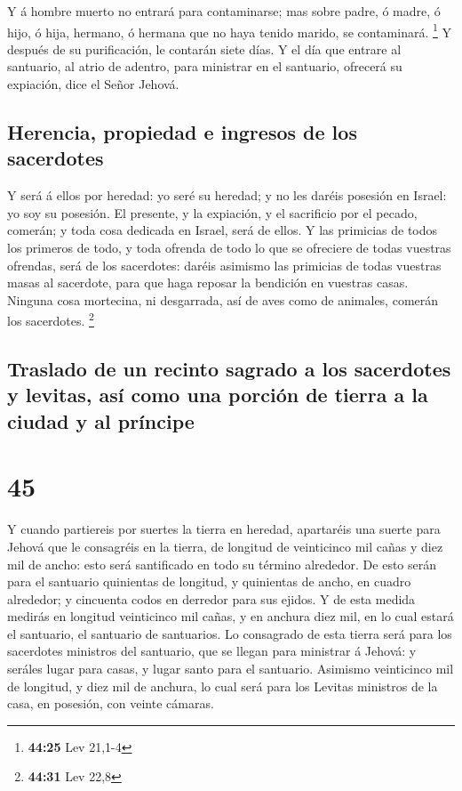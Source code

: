  Y á hombre muerto no entrará para contaminarse; mas sobre
padre, ó madre, ó hijo, ó hija, hermano, ó hermana que no haya tenido
marido, se contaminará. \footnote{\textbf{44:25} Lev 21,1-4}
 Y después de su purificación, le contarán siete días.
 Y el día que entrare al santuario, al atrio de adentro,
para ministrar en el santuario, ofrecerá su expiación, dice el Señor
Jehová.

\hypertarget{herencia-propiedad-e-ingresos-de-los-sacerdotes}{%
\subsection{Herencia, propiedad e ingresos de los
sacerdotes}\label{herencia-propiedad-e-ingresos-de-los-sacerdotes}}

 Y será á ellos por heredad: yo seré su heredad; y no les
daréis posesión en Israel: yo soy su posesión.  El
presente, y la expiación, y el sacrificio por el pecado, comerán; y toda
cosa dedicada en Israel, será de ellos.  Y las primicias de
todos los primeros de todo, y toda ofrenda de todo lo que se ofreciere
de todas vuestras ofrendas, será de los sacerdotes: daréis asimismo las
primicias de todas vuestras masas al sacerdote, para que haga reposar la
bendición en vuestras casas.  Ninguna cosa mortecina, ni
desgarrada, así de aves como de animales, comerán los sacerdotes.
\footnote{\textbf{44:31} Lev 22,8}

\hypertarget{traslado-de-un-recinto-sagrado-a-los-sacerdotes-y-levitas-asuxed-como-una-porciuxf3n-de-tierra-a-la-ciudad-y-al-pruxedncipe}{%
\subsection{Traslado de un recinto sagrado a los sacerdotes y levitas,
así como una porción de tierra a la ciudad y al
príncipe}\label{traslado-de-un-recinto-sagrado-a-los-sacerdotes-y-levitas-asuxed-como-una-porciuxf3n-de-tierra-a-la-ciudad-y-al-pruxedncipe}}

\hypertarget{section-44}{%
\section{45}\label{section-44}}

 Y cuando partiereis por suertes la tierra en heredad,
apartaréis una suerte para Jehová que le consagréis en la tierra, de
longitud de veinticinco mil cañas y diez mil de ancho: esto será
santificado en todo su término alrededor.  De esto serán
para el santuario quinientas de longitud, y quinientas de ancho, en
cuadro alrededor; y cincuenta codos en derredor para sus ejidos.
 Y de esta medida medirás en longitud veinticinco mil cañas,
y en anchura diez mil, en lo cual estará el santuario, el santuario de
santuarios.  Lo consagrado de esta tierra será para los
sacerdotes ministros del santuario, que se llegan para ministrar á
Jehová: y seráles lugar para casas, y lugar santo para el santuario.
 Asimismo veinticinco mil de longitud, y diez mil de
anchura, lo cual será para los Levitas ministros de la casa, en
posesión, con veinte cámaras.

